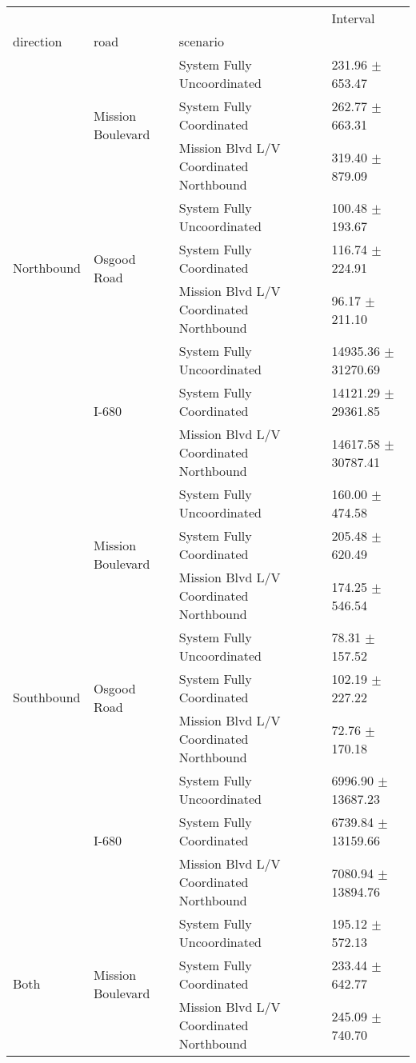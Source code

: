 \begin{tabular}{llll}
\toprule
 &  &  & Interval \\
direction & road & scenario &  \\
\midrule
\multirow[t]{9}{*}{Northbound} & \multirow[t]{3}{*}{Mission Boulevard} & System Fully Uncoordinated & 231.96 $\pm$ 653.47 \\
 &  & System Fully Coordinated & 262.77 $\pm$ 663.31 \\
 &  & Mission Blvd L/V Coordinated Northbound & 319.40 $\pm$ 879.09 \\
 & \multirow[t]{3}{*}{Osgood Road} & System Fully Uncoordinated & 100.48 $\pm$ 193.67 \\
 &  & System Fully Coordinated & 116.74 $\pm$ 224.91 \\
 &  & Mission Blvd L/V Coordinated Northbound & 96.17 $\pm$ 211.10 \\
 & \multirow[t]{3}{*}{I-680} & System Fully Uncoordinated & 14935.36 $\pm$ 31270.69 \\
 &  & System Fully Coordinated & 14121.29 $\pm$ 29361.85 \\
 &  & Mission Blvd L/V Coordinated Northbound & 14617.58 $\pm$ 30787.41 \\
\multirow[t]{9}{*}{Southbound} & \multirow[t]{3}{*}{Mission Boulevard} & System Fully Uncoordinated & 160.00 $\pm$ 474.58 \\
 &  & System Fully Coordinated & 205.48 $\pm$ 620.49 \\
 &  & Mission Blvd L/V Coordinated Northbound & 174.25 $\pm$ 546.54 \\
 & \multirow[t]{3}{*}{Osgood Road} & System Fully Uncoordinated & 78.31 $\pm$ 157.52 \\
 &  & System Fully Coordinated & 102.19 $\pm$ 227.22 \\
 &  & Mission Blvd L/V Coordinated Northbound & 72.76 $\pm$ 170.18 \\
 & \multirow[t]{3}{*}{I-680} & System Fully Uncoordinated & 6996.90 $\pm$ 13687.23 \\
 &  & System Fully Coordinated & 6739.84 $\pm$ 13159.66 \\
 &  & Mission Blvd L/V Coordinated Northbound & 7080.94 $\pm$ 13894.76 \\
\multirow[t]{9}{*}{Both} & \multirow[t]{3}{*}{Mission Boulevard} & System Fully Uncoordinated & 195.12 $\pm$ 572.13 \\
 &  & System Fully Coordinated & 233.44 $\pm$ 642.77 \\
 &  & Mission Blvd L/V Coordinated Northbound & 245.09 $\pm$ 740.70 \\

\end{tabular}
